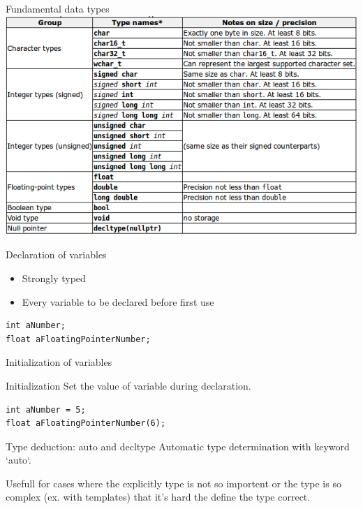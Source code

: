 \documentclass{beamer}
\begin{document}
\begin{frame}{Fundamental data types}
\includegraphics[scale=0.48]{img/FundamentalTypes.png}
\end{frame}

\begin{frame}[fragile]{Declaration of variables}
\begin{itemize}
  \item Strongly typed
  \item Every variable to be declared before first use
\end{itemize}
\begin{lstlisting}[caption=Variable declaration]
int aNumber;
float aFloatingPointerNumber;
\end{lstlisting}
\end{frame}

\begin{frame}[fragile]{Initialization of variables}
\begin{definition}{Initialization}
   Set the value of variable during declaration. 
\end{definition}
\begin{lstlisting}[caption=Variable initialization]
int aNumber = 5;
float aFloatingPointerNumber(6);
\end{lstlisting}
\end{frame}

\begin{frame}[fragile]{Type deduction: auto and decltype}
Automatic type determination with keyword `auto`.

Usefull for cases where the explicitly type is not so importent or the type is
so complex (ex. with templates) that it's hard the define the type correct.



\end{frame}
\end{document}
